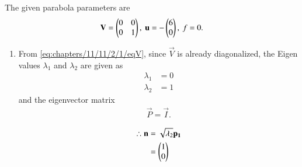 The given parabola parameters are
\begin{align}
	\label{eq:chapters/11/11/2/1/eqV}
	\mathbf{V} = \begin{pmatrix} 0 & 0 \\ 0 & 1\end{pmatrix},\
	\mathbf{u} = -\begin{pmatrix}6 \\ 0\end{pmatrix},\
	f = 0. 
\end{align}
\begin{enumerate}
\item  
From \eqref{eq:chapters/11/11/2/1/eqV}, since $\vec{V}$ is already diagonalized, the Eigen values $\lambda_1$ and $\lambda_2$ are given as 
\begin{align}
	\label{eq:chapters/11/11/2/1/eqEigen1}
	\lambda_1 &= 0 \\
	\label{eq:chapters/11/11/2/1/eqEigen2}
	\lambda_2 &= 1 
\end{align}
and the eigenvector matrix
\begin{align}
	\vec{P} = \vec{I}.
\end{align}

\begin{align}
	\therefore 
	\vec{n} &= \sqrt{\lambda_2}\vec{p_1} \\
	\label{eq:chapters/11/11/2/1/eqN}
	&= \myvec{1 \\ 0} 

\end{align}
\end{enumerate}
